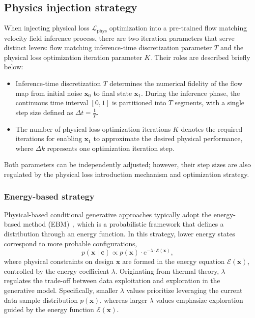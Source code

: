 \subsection{Physics injection strategy}
\label{ch7:subsect:physics}
When injecting physical loss $\mathcal{L}_{\mathrm{phys}}$ optimization into a pre-trained flow matching velocity field inference process, there are two iteration parameters that serve distinct levers: flow matching inference-time discretization parameter $T$ and the physical loss optimization iteration parameter $K$. Their roles are described briefly below:
\begin{itemize}
    \item Inference-time discretization $T$ determines the numerical fidelity of the flow map from initial noise $\mathbf{x}_0$ to final state $\mathbf{x}_1$. During the inference phase, the continuous time interval $[0, 1]$ is partitioned into $T$ segments, with a single step size defined as $\Delta t = \frac{1}{T}$. 
    \item The number of physical loss optimization iterations $K$ denotes the required iterations for enabling $\mathbf{x}_1$ to approximate the desired physical performance,  where $\Delta k$ represents one optimization iteration step.
\end{itemize}
Both parameters can be independently adjusted; however, their step sizes are also regulated by the physical loss introduction mechanism and optimization strategy. 

\subsubsection{Energy-based strategy}
\label{ch7:subsubsect:energy}
Physical-based conditional generative approaches typically adopt the energy-based method (EBM)~\cite{ai.LeCun2006,ai.Teh2003}, which is a probabilistic framework that defines a distribution through an energy function. In this strategy, lower energy states correspond to more probable configurations,
\begin{equation}
p(\textbf{x} \mid \textbf{c}) \propto p(\textbf{x}) \cdot \mathrm{e}^{-\lambda \cdot \mathcal{E}(\textbf{x})},
\label{ch7:eqn:energyEqn}
\end{equation}
where physical constraints on design $\textbf{x}$ are formed in the energy equation $\mathcal{E}(\textbf{x})$, controlled by the energy coefficient $\lambda$. Originating from thermal theory, $\lambda$ regulates the trade-off between data exploitation and exploration in the generative model. Specifically, smaller $\lambda$ values prioritize leveraging the current data sample distribution $p(\textbf{x})$, whereas larger $\lambda$ values emphasize exploration guided by the energy function $\mathcal{E}(\textbf{x})$.


